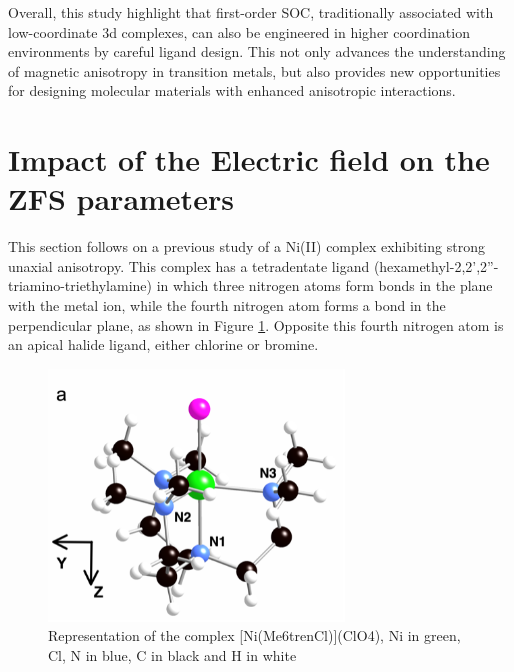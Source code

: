 \documentclass[12pt]{report}
\numberwithin{equation}{section}
\begin{document}
Overall, this study highlight that first-order SOC, traditionally associated with low-coordinate 3d complexes, can also be engineered in higher coordination environments by careful ligand design.
This not only advances the understanding of magnetic anisotropy in transition metals, but also provides new opportunities for designing molecular materials with enhanced anisotropic interactions.


\newpage


\newpage

\section{Impact of the Electric field on the ZFS parameters}

This section follows on a previous study of a Ni(II) complex exhibiting strong unaxial anisotropy.
This complex has a tetradentate ligand (hexamethyl-2,2',2''-triamino-triethylamine) in which three nitrogen atoms form bonds in the plane with the metal ion, while the fourth nitrogen atom forms a bond in the perpendicular plane, as shown in Figure \ref{NiMe6tren}.
Opposite this fourth nitrogen atom is an apical halide ligand, either chlorine or bromine.

\begin{figure}[!ht]
    \centering
    \includegraphics[width=0.7\textwidth]{Images/NiMe6trenTalal.png}
    \caption[Representation of the complex Ni(Me6trenCl)(ClO4)]{Representation of the complex [Ni(Me6trenCl)](ClO4), Ni in green, Cl, N in blue, C in black and H in white}
    \label{NiMe6tren}
\end{figure}
\end{document}
